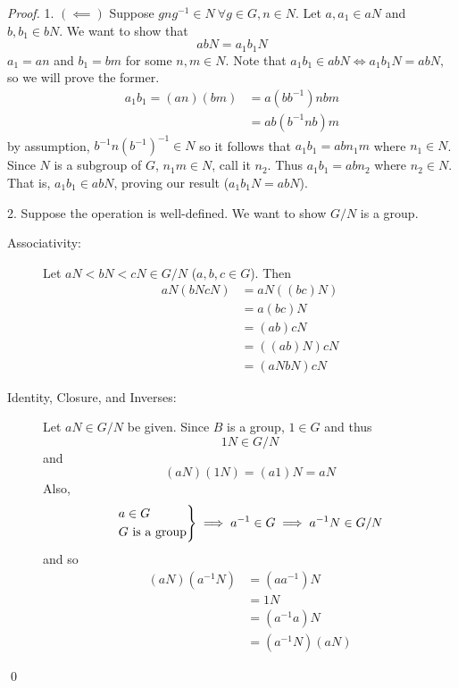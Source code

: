 \begin{proof}
    1. $(\impliedby)$ Suppose $gng^{-1} \in N ~\forall g \in G, n \in N$. Let $a, a_1 \in aN$ and $b, b_1 \in bN$. We want to show that 
    $$abN = a_1b_1N$$
    $a_1 = an$ and $b_1 = bm$ for some $n,m \in N$. Note that $a_1b_1 \in abN \iff a_1b_1N = abN,$ so we will prove the former.
    \begin{align*}
        a_1b_1 = (an)(bm) &= a(bb^{-1})nbm \\
        &= ab(b^{-1}nb)m
    \end{align*}
    by assumption, $b^{-1}n(b^{-1})^{-1} \in N$ so it follows that $a_1b_1 = abn_1m$ where $n_1 \in N$. Since $N$ is a subgroup of $G$, $n_1m \in N$, call it $n_2$. Thus $a_1b_1 = abn_2$ where $n_2 \in N$. That is, $a_1b_1 \in abN$, proving our result ($a_1b_1N = abN$).
    
    2. Suppose the operation is well-defined. We want to show $G/N$ is a group.
    \begin{description}
        \item[Associativity: ] Let $aN< bN< cN \in G/N$ ($a,b,c \in G$). Then 
        \begin{align*}
            aN(bNcN) &= aN\left((bc)N\right) \\
            &= a(bc)N \\
            &=(ab)cN \\
            &=\left((ab)N\right)cN \\
            &= (aNbN)cN
        \end{align*}
        \item[Identity, Closure, and Inverses: ] Let $aN \in G/N$ be given. Since $B$ is a group, $1 \in G$ and thus
        $$1N \in G/N$$
        and
        $$(aN)(1N) = (a1)N = aN$$
        Also,
        \begin{align*}
            \begin{rcases*}
                a \in G \\
                G \text{ is a group}
            \end{rcases*} \implies a^{-1} \in G \implies a^{-1}N \in G/N
        \end{align*}
        and so
        \begin{align*}
            (aN)(a^{-1}N) &= (aa^{-1})N \\
            &= 1N \\
            &= (a^{-1}a)N \\
            &= (a^{-1}N)(aN)
        \end{align*}
    \end{description}
    \qed
\end{proof}

